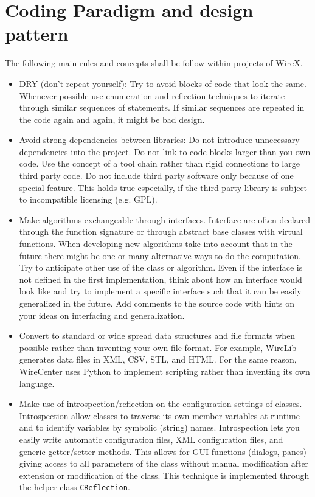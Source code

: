 \documentclass[11pt,a4paper,onepage,openany]{book}
\begin{document}
\section{Coding Paradigm and design pattern}
The following main rules and concepts shall be follow within projects of
WireX.
\begin{itemize}
\item DRY (don't repeat yourself): Try to avoid blocks of code that look the
    same. Whenever possible use enumeration and reflection techniques to
    iterate through similar sequences of statements. If similar sequences
    are
    repeated in the code again and again, it might be bad design.

\item Avoid strong dependencies between libraries: Do not introduce
    unnecessary dependencies into the project. Do not link to code blocks
    larger than you own code. Use the concept of a tool chain rather than
    rigid connections to large third party code. Do not include third party
    software only because of one special feature. This holds true
    especially,
    if the third party library is subject to incompatible licensing (e.g.
    GPL).

\item Make algorithms exchangeable through interfaces. Interface are often
    declared through the function signature or through abstract base classes
    with virtual functions. When developing new algorithms take into account
    that in the future there might be one or many alternative ways to do the
    computation. Try to anticipate other use of the class or algorithm. Even
    if the interface is not defined in the first implementation, think about
    how an interface would look like and try to implement a specific
    interface such that it can be easily generalized in the future. Add
    comments to the source code with hints on your ideas on interfacing and
    generalization.

\item Convert to standard or wide spread data structures and file formats
    when possible rather than inventing your own file format. For example,
    WireLib generates data files in XML, CSV, STL, and HTML. For the same
    reason, WireCenter uses Python to implement scripting rather than
    inventing its own language.

\item Make use of introspection/reflection on the configuration settings of
    classes. Introspection allow classes to traverse its own member variables
    at runtime and to identify variables by symbolic (string) names.
    Introspection lets you easily write automatic configuration files, XML
    configuration files, and generic getter/setter methods. This allows for
    GUI functions (dialogs, panes) giving access to all parameters of the
    class without manual modification after extension or modification of the
    class. This technique is implemented through the helper class
    \texttt{CReflection}.


\end{itemize}
\end{document}
